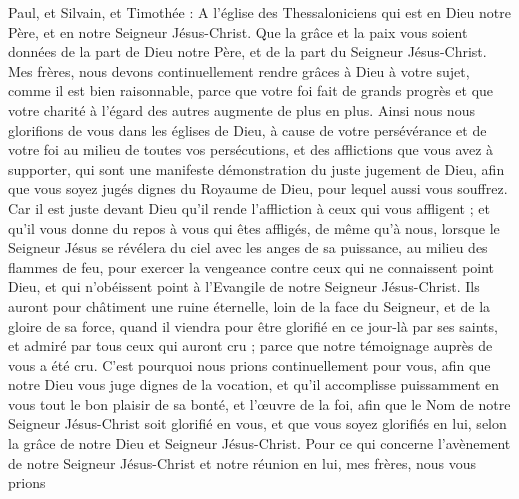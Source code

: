 \BFont
\begin{multicols}{2}
\TextTitle{[Introduction]}
\VerseOne{}Paul, et Silvain, et Timothée : A l'église des Thessaloniciens qui est en Dieu notre Père, et en notre Seigneur Jésus-Christ.
Que la grâce et la paix vous soient données de la part de Dieu notre Père, et de la part du Seigneur Jésus-Christ.
Mes frères, nous devons continuellement rendre grâces à Dieu à votre sujet, comme il est bien raisonnable, parce que votre foi fait de grands progrès et que votre charité à l’égard des autres augmente de plus en plus.
Ainsi nous nous glorifions de vous dans les églises de Dieu, à cause de votre persévérance et de votre foi au milieu de toutes vos persécutions, et des afflictions que vous avez à supporter,
qui sont une manifeste démonstration du juste jugement de Dieu, afin que vous soyez jugés dignes du Royaume de Dieu, pour lequel aussi vous souffrez.
Car il est juste devant Dieu qu'il rende l'affliction à ceux qui vous affligent ;
et qu'il vous donne du repos à vous qui êtes affligés, de même qu'à nous, lorsque le Seigneur Jésus se révélera du ciel avec les anges de sa puissance,
au milieu des flammes de feu, pour exercer la vengeance contre ceux qui ne connaissent point Dieu, et qui n'obéissent point à l'Evangile de notre Seigneur Jésus-Christ.
Ils auront pour châtiment une ruine éternelle, loin de la face du Seigneur, et de la gloire de sa force,
quand il viendra pour être glorifié en ce jour-là par ses saints, et admiré par tous ceux qui auront cru ; parce que notre témoignage auprès de vous a été cru.
C'est pourquoi nous prions continuellement pour vous, afin que notre Dieu vous juge dignes de la vocation, et qu'il accomplisse puissamment en vous tout le bon plaisir de sa bonté, et l’œuvre de la foi,
afin que le Nom de notre Seigneur Jésus-Christ soit glorifié en vous, et que vous soyez glorifiés en lui, selon la grâce de notre Dieu et Seigneur Jésus-Christ.
\VerseOne{}Pour ce qui concerne l'avènement de notre Seigneur Jésus-Christ et notre réunion en lui, mes frères, nous vous prions

\end{multicols}
